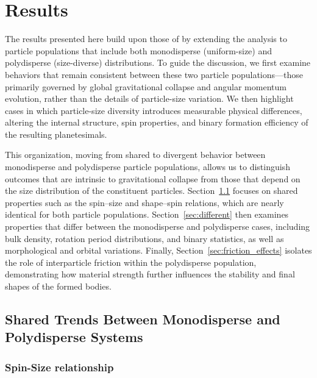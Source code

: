 \documentclass[fleqn,usenatbib]{mnras}
\begin{document}
\section{Results}\label{sec:results}
The results presented here build upon those of \citet{Barnes2025} by extending the analysis to particle populations that include both monodisperse (uniform-size) and polydisperse (size-diverse) distributions. 
To guide the discussion, we first examine behaviors that remain consistent between these two particle populations—those primarily governed by global gravitational collapse and angular momentum evolution, rather than the details of particle-size variation. 
We then highlight cases in which particle-size diversity introduces measurable physical differences, altering the internal structure, spin properties, and binary formation efficiency of the resulting planetesimals. 

This organization, moving from shared to divergent behavior between monodisperse and polydisperse particle populations, allows us to distinguish outcomes that are intrinsic to gravitational collapse from those that depend on the size distribution of the constituent particles. Section~\ref{sec:shared} focuses on shared properties such as the spin–size and shape–spin relations, which are nearly identical for both particle populations. Section~\ref{sec:different} then examines properties that differ between the monodisperse and polydisperse cases, including bulk density, rotation period distributions, and binary statistics, as well as morphological and orbital variations. Finally, Section~\ref{sec:friction_effects} isolates the role of interparticle friction within the polydisperse population, demonstrating how material strength further influences the stability and final shapes of the formed bodies.

\subsection{Shared Trends Between Monodisperse and Polydisperse Systems}\label{sec:shared}
\subsubsection{Spin-Size relationship}
\end{document}
